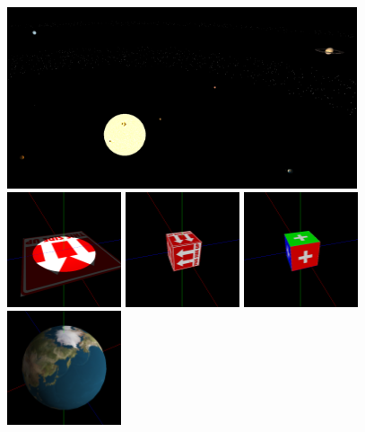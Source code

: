 \documentclass[12pt, a4paper]{article}
\begin{document}
\begin{figure}[H]
    \centering
    \includegraphics[width=0.92\textwidth]{res/phase4/results/SolarSystem.png}
    \includegraphics[width=0.3\textwidth]{res/phase4/results/Plane.png}
    \includegraphics[width=0.3\textwidth]{res/phase4/results/BoxSingleTexture.png}
    \includegraphics[width=0.3\textwidth]{res/phase4/results/BoxMultiTexture.png}
    \includegraphics[width=0.3\textwidth]{res/phase4/results/Sphere.png}

\end{figure}
\end{document}
